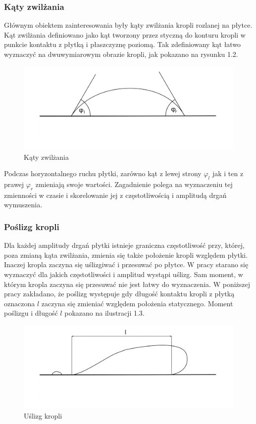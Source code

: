 \subsubsection{Kąty zwilżania}
Głównym obiektem zainteresowania były kąty zwilżania kropli rozlanej na płytce. Kąt zwilżania definiowano jako kąt tworzony przez styczną do konturu kropli w punkcie kontaktu z płytką i płaszczyznę poziomą. Tak zdefiniowany kąt łatwo wyznaczyć na dwuwymiarowym obrazie kropli, jak pokazano na rysunku 1.2.

\begin{figure}[!h]
    \label{fig:kąt_zwilżania}
    \centering \includegraphics[width=0.9\linewidth]{img/kat_zwilzania.png}
    \caption{Kąty zwilżania}
\end{figure}

Podczas horyzontalnego ruchu płytki, zarówno kąt z lewej strony $\varphi_l$ jak i ten z prawej $\varphi_r$ zmieniają swoje wartości. Zagadnienie polega na wyznaczeniu tej zmienności w czasie i skorelowanie jej z częstotliwością i amplitudą drgań wymuszenia.\\


\subsubsection{Poślizg kropli}
Dla każdej amplitudy drgań płytki istnieje graniczna częstotliwość przy, której, poza zmianą kąta zwilżania, zmienia się także położenie kropli względem płytki. Inaczej kropla zaczyna się uślizgiwać i przesuwać po płytce. W pracy starano się wyznaczyć dla jakich częstotliwości i amplitud wystąpi uślizg. Sam moment, w którym kropla zaczyna się przesuwać nie jest łatwy do wyznaczenia. W poniższej pracy zakładano, że poślizg występuje gdy długość kontaktu kropli z płytką oznaczona $l$ zaczyna się zmieniać względem położenia statycznego. Moment poślizgu i długość $l$ pokazano na ilustracji 1.3.


\begin{figure}[!h]
    \label{fig:poślizg}
    \centering \includegraphics[width=0.9\linewidth]{img/poslizg.png}
    \caption{Uślizg kropli}
\end{figure}

